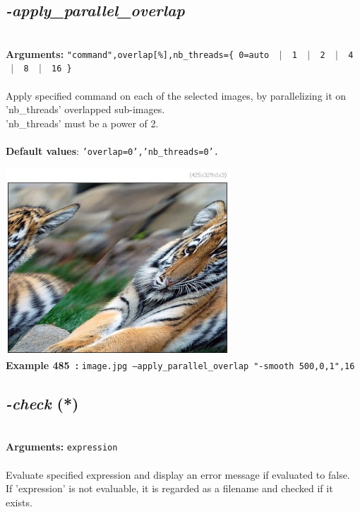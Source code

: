 \documentclass[a4paper,11pt,twoside]{book}
\begin{document}
\subsection{\emph{-apply\_parallel\_overlap} }\vspace*{-0.5em}
~\\\textbf{Arguments: } 
{\small \texttt{"command",overlap[\%],nb\_threads=\{ 0=auto ~$|$~ 1 ~$|$~ 2 ~$|$~ 4 ~$|$~ 8 ~$|$~ 16 \}}}\\~\\
Apply specified command on each of the selected images, by parallelizing it on 'nb\_threads' overlapped sub-images.
~\\'nb\_threads' must be a power of 2.
~\\~\\\textbf{Default values}: {\small \texttt{'overlap=0','nb\_threads=0'.}}
\begin{center}\includegraphics[keepaspectratio=true,height=7cm,width=\textwidth]{img/gmic_def485.jpg}\\
{\footnotesize \textbf{Example 485~:} \texttt{image.jpg --apply\_parallel\_overlap "-smooth 500,0,1",16}}
\end{center}

\subsection{\emph{-check} (*)}\vspace*{-0.5em}
~\\\textbf{Arguments: } 
{\small \texttt{expression}}\\~\\
Evaluate specified expression and display an error message if evaluated to false.
~\\If 'expression' is not evaluable, it is regarded as a filename and checked if it exists.
\end{document}

